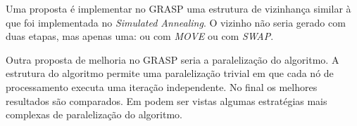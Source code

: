\documentclass[11pt]{article}
\begin{document}
Uma proposta é implementar no GRASP uma estrutura de vizinhança similar à que foi implementada no \textit{Simulated Annealing}. O vizinho não seria gerado com duas etapas, mas apenas uma: ou com \textit{MOVE} ou com \textit{SWAP}.

Outra proposta de melhoria no GRASP seria a paralelização do algoritmo. A estrutura do algoritmo permite uma paralelização trivial em que cada nó de processamento executa uma iteração independente. No final os melhores resultados são comparados. Em \cite{grasp_paralelo} podem ser vistas algumas estratégias mais complexas de paralelização do algoritmo.





\end{document}
